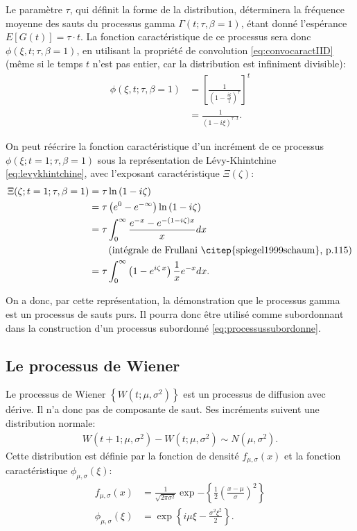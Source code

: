 Le paramètre $\tau$, qui définit la forme de la distribution,
déterminera la fréquence moyenne des sauts du processus gamma
$\Gamma(t;\tau,\beta=1)$, étant donné l'espérance $E[G(t)] = \tau\cdot
t$. La fonction caractéristique de ce processus sera donc
$\phi(\xi,t;\tau,\beta=1)$, en utilisant la propriété de convolution
\eqref{eq:convocaractIID} (même si le temps $t$ n'est pas entier, car
la distribution est infiniment divisible):
\begin{align}
  \phi(\xi,t;\tau,\beta=1) &= \left[\frac{1}{\left(1-\frac{i\xi}{1}\right)^{\tau}}\right]^t \nonumber\\
  &= \frac{1}{\left(1-i\xi\right)^{\tau\cdot t}}.
\end{align}

On peut réécrire la fonction caractéristique d'un incrément de ce
processus $\phi(\xi;t=1;\tau,\beta=1)$ sous la représentation de
Lévy-Khintchine \eqref{eq:levykhintchine}, avec l'exposant
caractéristique $\Xi(\zeta)$:
\begin{align}
  \label{eq:exposantchargamma}
  \Xi(\zeta;t=1;\tau,\beta=1) &= \tau\ln{\left(1-i\zeta\right)} \\
  &= \tau \left(e^{0} - e^{-\infty}\right) \ln{\left(1-i\zeta \right)} \nonumber\\
  &= \tau \int_{0}^{\infty} \frac{e^{-x} - e^{-(1-i\zeta)x}}{x} dx \nonumber\\
  &\qquad\mbox{(intégrale de Frullani \citep{spiegel1999schaum}, p.115)} \nonumber\\
  &= \tau \int_{0}^{\infty}
  \left(1-e^{i\zeta\,x}\right)\frac{1}{x}e^{-x}dx.
\end{align}

On a donc, par cette représentation, la démonstration que le processus
gamma est un processus de sauts purs. Il pourra donc être utilisé
comme subordonnant dans la construction d'un processus subordonné
\eqref{eq:processussubordonne}.

\subsection{Le processus de Wiener}
\label{sec:mouvementbrownien}

Le processus de Wiener $\left\{W(t;\mu,\sigma^2)\right\}$ est un
processus de diffusion avec dérive. Il n'a donc pas de composante de
saut. Ses incréments suivent une distribution normale:
\begin{align}
  \label{eq:incrwiener}
  W(t+1;\mu,\sigma^2) - W(t;\mu,\sigma^2) \sim N(\mu,\sigma^2).
\end{align}
Cette distribution est définie par la fonction de densité
$f_{\mu,\sigma}(x)$ et la fonction caractéristique
$\phi_{\mu,\sigma}(\xi)$:
\begin{align}
  f_{\mu,\sigma}(x) &= \frac{1}{\sqrt{2\pi\sigma^2}}\exp{-\left\{\frac{1}{2} \left(\frac{x-\mu}{\sigma} \right)^2\right\}} \label{eq:fndensitenormale} \\
  \phi_{\mu,\sigma}(\xi) &= \exp\left\{
    i\mu\xi-\frac{\sigma^2\xi^2}{2}
  \right\} \label{eq:fncaractnormale}.
\end{align}

